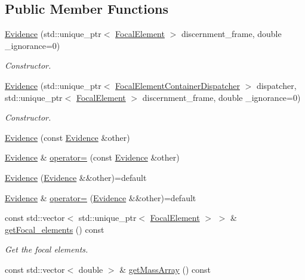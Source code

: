\subsection*{Public Member Functions}
\begin{DoxyCompactItemize}
\item 
\hyperlink{classEvidence_a85bcdfc070d0885b2c49c6930fe5a30f}{Evidence} (std\+::unique\+\_\+ptr$<$ \hyperlink{classFocalElement}{Focal\+Element} $>$ discernment\+\_\+frame, double \+\_\+ignorance=0)
\begin{DoxyCompactList}\small\item\em Constructor. \end{DoxyCompactList}\item 
\hyperlink{classEvidence_a0e7f11da2d686f8a33e3e59937b543d5}{Evidence} (std\+::unique\+\_\+ptr$<$ \hyperlink{classFocalElementContainerDispatcher}{Focal\+Element\+Container\+Dispatcher} $>$ dispatcher, std\+::unique\+\_\+ptr$<$ \hyperlink{classFocalElement}{Focal\+Element} $>$ discernment\+\_\+frame, double \+\_\+ignorance=0)
\begin{DoxyCompactList}\small\item\em Constructor. \end{DoxyCompactList}\item 
\hyperlink{classEvidence_a5e0b5cb75efbbcff102602ab07ed0ce5}{Evidence} (const \hyperlink{classEvidence}{Evidence} \&other)
\item 
\hyperlink{classEvidence}{Evidence} \& \hyperlink{classEvidence_a2e6f8b584bba250e859e4b8f16f286e2}{operator=} (const \hyperlink{classEvidence}{Evidence} \&other)
\item 
\hyperlink{classEvidence_a749172343fd62d98eb6c42636b5b61a4}{Evidence} (\hyperlink{classEvidence}{Evidence} \&\&other)=default
\item 
\hyperlink{classEvidence}{Evidence} \& \hyperlink{classEvidence_a02106bb9e91afce2555be1cd830862de}{operator=} (\hyperlink{classEvidence}{Evidence} \&\&other)=default
\item 
const std\+::vector$<$ std\+::unique\+\_\+ptr$<$ \hyperlink{classFocalElement}{Focal\+Element} $>$ $>$ \& \hyperlink{classEvidence_ab2d805af2fafd03c9d148040eeb181b0}{get\+Focal\+\_\+elements} () const 
\begin{DoxyCompactList}\small\item\em Get the focal elements. \end{DoxyCompactList}\item 
const std\+::vector$<$ double $>$ \& \hyperlink{classEvidence_a5cbcf217bf5159feccedba5edbd250c1}{get\+Mass\+Array} () const 

\end{DoxyCompactItemize}
